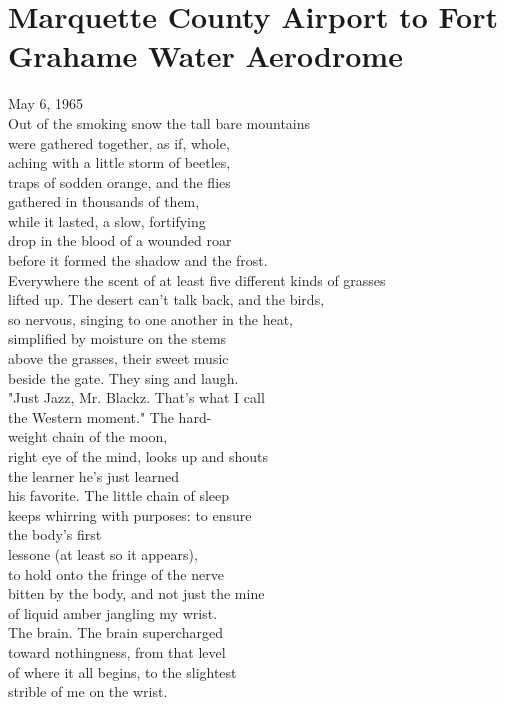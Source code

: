 \documentclass[smalldemyvopaper,11pt,twoside,onecolumn,openright,extrafontsizes]{memoir}
\newlength\drop
\begin{document}
\chapter{Marquette County Airport to Fort Grahame Water Aerodrome}
May 6, 1965
\\Out of the smoking snow the tall bare mountains
\\were gathered together, as if, whole,
\\aching with a little storm of beetles,
\\traps of sodden orange, and the flies
\\gathered in thousands of them,
\\while it lasted, a slow, fortifying
\\drop in the blood of a wounded roar
\\before it formed the shadow and the frost.
\\Everywhere the scent of at least five different kinds of grasses
\\lifted up. The desert can't talk back, and the birds,
\\so nervous, singing to one another in the heat,
\\simplified by moisture on the stems
\\above the grasses, their sweet music
\\beside the gate. They sing and laugh.
\\"Just Jazz, Mr. Blackz. That's what I call
\\the Western moment." The hard-
\\weight chain of the moon,
\\right eye of the mind, looks up and shouts
\\the learner he's just learned
\\his favorite. The little chain of sleep
\\keeps whirring with purposes: to ensure
\\the body's first
\\lessone (at least so it appears),
\\to hold onto the fringe of the nerve
\\bitten by the body, and not just the mine
\\of liquid amber jangling my wrist.
\\The brain. The brain supercharged
\\toward nothingness, from that level
\\of where it all begins, to the slightest
\\strible of me on the wrist.
\end{document}
